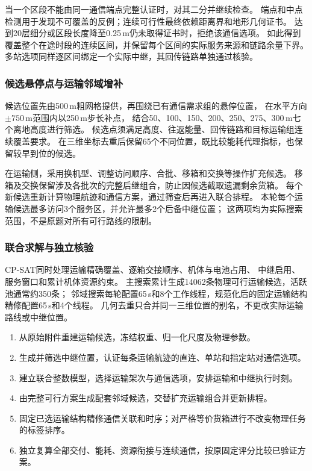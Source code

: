 当一个区段不能由同一通信端点完整认证时，对其二分并继续检查。
端点和中点检测用于发现不可覆盖的反例；连续可行性最终依赖距离界和地形几何证书。
达到20层细分或区段长度降至0.25\,m仍未取得证书时，拒绝该通信选项。
如此得到覆盖整个在途时段的连续区间，并保留每个区间的实际服务来源和链路余量下界。
多站选项同样逐区间绑定一个实际中继，其回传链路单独通过核验。

\subsubsection{候选悬停点与运输邻域增补}
候选位置先由500\,m粗网格提供，再围绕已有通信需求组的悬停位置，
在水平方向$\pm750$\,m范围内以250\,m步长补点，
结合50、100、150、200、250、275、300\,m七个离地高度进行筛选。
候选点须满足高度、往返能量、回传链路和目标运输组连续覆盖要求。
在三维坐标去重后保留65个不同位置，既比较能耗代理指标，也保留较早到位的候选。

在运输侧，采用换机型、调整访问顺序、合批、移箱和交换等操作扩充候选。
移箱及交换保留涉及各批次的完整后继组合，防止因候选截取遗漏剩余货箱。
每个新候选重新计算物理航迹和通信方案，通过筛查后再进入联合排程。
本轮每个运输候选最多访问3个服务区，并允许最多2个后备中继位置；
这两项均为实际搜索范围，不是原题对所有可行路线的限制。

\subsubsection{联合求解与独立核验}
CP-SAT同时处理运输精确覆盖、逐箱交接顺序、机体与电池占用、
中继启用、服务窗口和累计机体资源约束。
主搜索累计生成14062条物理可行运输候选，活跃池通常约350条；
邻域搜索每轮配置65\,s和8个工作线程，规范化后的固定运输结构精修配置65\,s和4个线程。
几何去重只合并同一三维位置的别名，不更改实际运输路线或中继位置。

\begin{enumerate}
 \item 从原始附件重建运输候选，冻结权重、归一化尺度及物理参数。
 \item 生成并筛选中继位置，认证每条运输航迹的直连、单站和指定站对通信选项。
 \item 建立联合整数模型，选择运输架次与通信选项，安排运输和中继执行时刻。
 \item 由完整可行方案生成配套邻域候选，交替扩充运输组合并更新排程。
 \item 固定已选运输结构精修通信关联和时序；对严格等价货箱进行不改变物理任务的标签排序。
 \item 独立复算全部交付、能耗、资源衔接与连续通信，按原固定评分比较已验证方案。
\end{enumerate}

